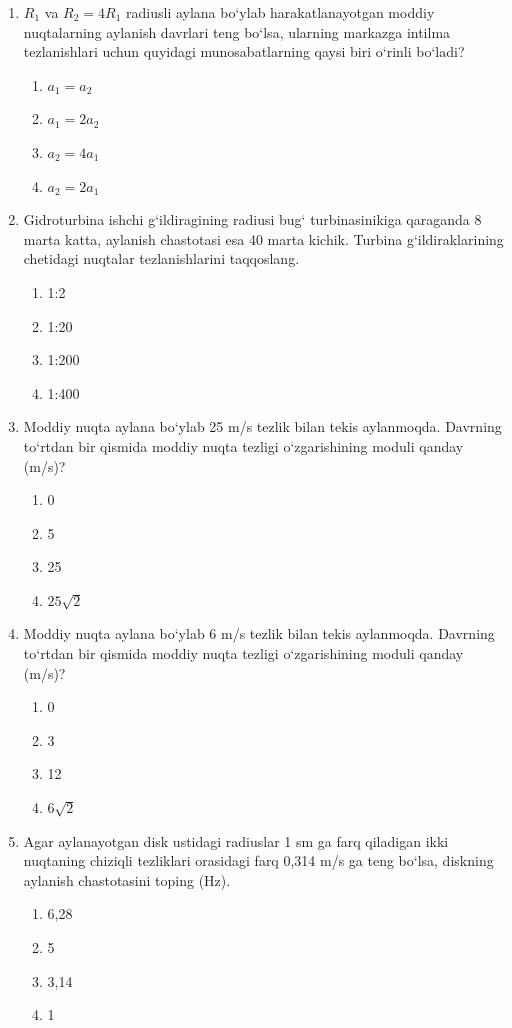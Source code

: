 \begin{enumerate}
\item $R_1$ va $R_2=4R_1$ radiusli aylana bo‘ylab harakatlanayotgan moddiy nuqtalarning aylanish davrlari teng bo‘lsa, ularning markazga intilma tezlanishlari uchun quyidagi munosabatlarning qaysi biri o‘rinli bo‘ladi?
\begin{enumerate}[label=\Alph*)]
\item $a_1=a_2$
\item $a_1=2a_2$
\item $a_2=4a_1$
\item $a_2=2a_1$
\end{enumerate}

\item Gidroturbina ishchi g‘ildiragining radiusi bug‘ turbinasinikiga qaraganda 8 marta katta, aylanish chastotasi esa 40 marta kichik. Turbina g‘ildiraklarining chetidagi nuqtalar tezlanishlarini taqqoslang.
\begin{enumerate}[label=\Alph*)]
\item 1:2
\item 1:20
\item 1:200
\item 1:400
\end{enumerate}

\item Moddiy nuqta aylana bo‘ylab 25 m/s tezlik bilan tekis aylanmoqda. Davrning to‘rtdan bir qismida moddiy nuqta tezligi o‘zgarishining moduli qanday (m/s)?
\begin{enumerate}[label=\Alph*)]
\item 0
\item 5
\item 25
\item $25\sqrt{2}$
\end{enumerate}

\item Moddiy nuqta aylana bo‘ylab 6 m/s tezlik bilan tekis aylanmoqda. Davrning to‘rtdan bir qismida moddiy nuqta tezligi o‘zgarishining moduli qanday (m/s)?
\begin{enumerate}[label=\Alph*)]
\item 0
\item 3
\item 12
\item $6\sqrt{2}$
\end{enumerate}

\item Agar aylanayotgan disk ustidagi radiuslar 1 sm ga farq qiladigan ikki nuqtaning chiziqli tezliklari orasidagi farq 0,314 m/s ga teng bo‘lsa, diskning aylanish chastotasini toping (Hz).
\begin{enumerate}[label=\Alph*)]
\item 6,28
\item 5
\item 3,14
\item 1
\end{enumerate}

\end{enumerate}




